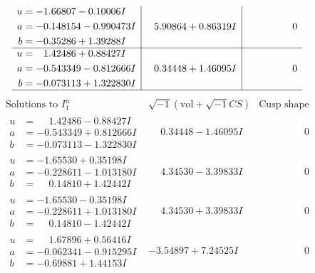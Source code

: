 \documentclass[1p]{elsarticle_modified}
\theoremstyle{definition}
\newcommand{\I}{\sqrt{-1}}
\begin{document}
$$\begin{array}{c|c|c}
\begin{aligned}
u &= -1.66807 - 0.10006 I \\
a &= -0.148154 - 0.990473 I \\
b &= -0.35286 + 1.39288 I\end{aligned}
 & \phantom{-}5.90864 + 0.86319 I & \phantom{-0.000000 } 0 \\ \hline\begin{aligned}
u &= \phantom{-}1.42486 + 0.88427 I \\
a &= -0.543349 - 0.812666 I \\
b &= -0.073113 + 1.322830 I\end{aligned}
 & \phantom{-}0.34448 + 1.46095 I & \phantom{-0.000000 } 0\\
 \hline 
 \end{array}$$\newpage$$\begin{array}{c|c|c}  
\text{Solutions to }I^u_{1}& \I (\text{vol} + \sqrt{-1}CS) & \text{Cusp shape}\\
 \hline 
\begin{aligned}
u &= \phantom{-}1.42486 - 0.88427 I \\
a &= -0.543349 + 0.812666 I \\
b &= -0.073113 - 1.322830 I\end{aligned}
 & \phantom{-}0.34448 - 1.46095 I & \phantom{-0.000000 } 0 \\ \hline\begin{aligned}
u &= -1.65530 + 0.35198 I \\
a &= -0.228611 - 1.013180 I \\
b &= \phantom{-}0.14810 + 1.42442 I\end{aligned}
 & \phantom{-}4.34530 - 3.39833 I & \phantom{-0.000000 } 0 \\ \hline\begin{aligned}
u &= -1.65530 - 0.35198 I \\
a &= -0.228611 + 1.013180 I \\
b &= \phantom{-}0.14810 - 1.42442 I\end{aligned}
 & \phantom{-}4.34530 + 3.39833 I & \phantom{-0.000000 } 0 \\ \hline\begin{aligned}
u &= \phantom{-}1.67896 + 0.56416 I \\
a &= -0.062341 - 0.915295 I \\
b &= -0.69881 + 1.44153 I\end{aligned}
 & -3.54897 + 7.24525 I & \phantom{-0.000000 } 0 \\ \hline\begin{aligned}

\end{aligned}
\end{array}$$
\end{document}
